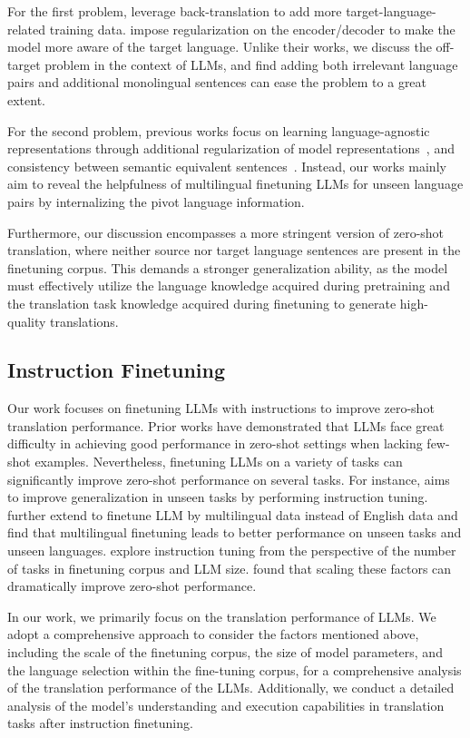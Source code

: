 For the first problem, \citet{gu-etal-2019-improved,zhang-etal-2020-improving} leverage back-translation to add more target-language-related training data. \citet{arivazhagan2019missing,liu-etal-2021-improving} impose regularization on the encoder/decoder to make the model more aware of the target language. Unlike their works, we discuss the off-target problem in the context of LLMs, and find adding both irrelevant language pairs and additional monolingual sentences can ease the problem to a great extent.

For the second problem, previous works focus on learning language-agnostic representations through additional regularization of model representations~\citep{arivazhagan2019missing,pan-etal-2021-multilingual}, and consistency between semantic equivalent sentences~\citep{al-shedivat-parikh-2019-consistency,yang-etal-2021-multilingual}. Instead, our works mainly aim to reveal the helpfulness of multilingual finetuning LLMs for unseen language pairs by internalizing the pivot language information.

Furthermore, our discussion encompasses a more stringent version of zero-shot translation, where neither source nor target language sentences are present in the finetuning corpus. This demands a stronger generalization ability, as the model must effectively utilize the language knowledge acquired during pretraining and the translation task knowledge acquired during finetuning to generate high-quality translations.

\subsection{Instruction Finetuning}

Our work focuses on finetuning LLMs with instructions to improve zero-shot translation performance. Prior works have demonstrated that LLMs face great difficulty in achieving good performance in zero-shot settings when lacking few-shot examples. Nevertheless,  finetuning LLMs on a variety
of tasks can significantly improve zero-shot performance on several tasks. For instance, \citet{wei2022finetuned} aims to improve generalization in unseen tasks by performing instruction tuning. \citet{muennighoff2023crosslingual} further extend to finetune LLM by multilingual data instead of English data and find that multilingual finetuning leads to better performance on unseen tasks and unseen languages. \citet{chung2022scaling} explore instruction tuning from the perspective of the number of tasks in finetuning corpus and LLM size. \citet{chung2022scaling} found that scaling these factors can dramatically improve zero-shot performance.

In our work, we primarily focus on the translation performance of LLMs. We adopt a comprehensive approach to consider the factors mentioned above, including the scale of the finetuning corpus, the size of model parameters, and the language selection within the fine-tuning corpus, for a comprehensive analysis of the translation performance of the LLMs. Additionally, we conduct a detailed analysis of the model's understanding and execution capabilities in translation tasks after instruction finetuning.

